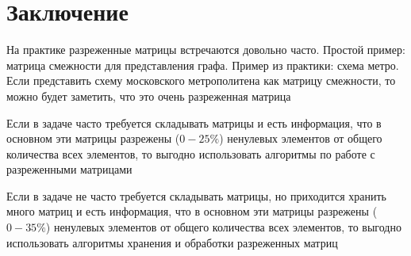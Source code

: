\section*{Заключение}

На практике разреженные матрицы встречаются довольно часто. Простой пример: матрица смежности для представления графа. Пример из практики: схема метро. Если представить схему московского метрополитена как матрицу смежности, то можно будет заметить, что это очень разреженная матрица

Если в задаче часто требуется складывать матрицы и есть информация, что в основном эти матрицы разрежены ($0-25\%$) ненулевых элементов от общего количества всех элементов, то выгодно использовать алгоритмы по работе с разреженными матрицами

Если в задаче не часто требуется складывать матрицы, но приходится хранить много матриц и есть информация, что в основном эти матрицы разрежены ($0-35\%$) ненулевых элементов от общего количества всех элементов, то выгодно использовать алгоритмы хранения и обработки разреженных матриц
